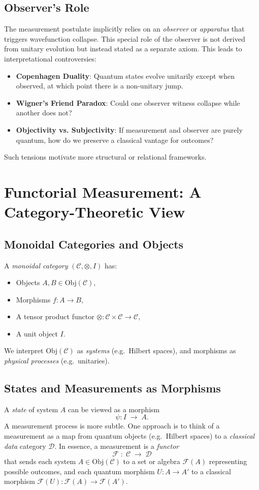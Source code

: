 \documentclass[12pt]{article}
\begin{document}
\subsection{Observer's Role}
The measurement postulate implicitly relies on an \emph{observer} or \emph{apparatus} that triggers 
wavefunction collapse. This special role of the observer is not derived from unitary evolution but instead 
stated as a separate axiom. This leads to interpretational controversies:
\begin{itemize}
    \item \textbf{Copenhagen Duality}: Quantum states evolve unitarily except when observed, at which point 
    there is a non-unitary jump.
    \item \textbf{Wigner's Friend Paradox}: Could one observer witness collapse while another does not?
    \item \textbf{Objectivity vs. Subjectivity}: If measurement and observer are purely quantum, how do we 
    preserve a classical vantage for outcomes?
\end{itemize}
Such tensions motivate more structural or relational frameworks.

\section{Functorial Measurement: A Category-Theoretic View}
\label{sec:functorialMeasurement}

\subsection{Monoidal Categories and Objects}
A \emph{monoidal category} \((\mathcal{C},\otimes, I)\) has:
\begin{itemize}
    \item Objects \(A, B \in \mathrm{Obj}(\mathcal{C})\),
    \item Morphisms \(f : A \to B\),
    \item A tensor product functor \(\otimes : \mathcal{C} \times \mathcal{C} \to \mathcal{C}\),
    \item A unit object \(I\).
\end{itemize}
We interpret \(\mathrm{Obj}(\mathcal{C})\) as \emph{systems} (e.g.\ Hilbert spaces), 
and morphisms as \emph{physical processes} (e.g.\ unitaries).

\subsection{States and Measurements as Morphisms}
A \emph{state} of system \(A\) can be viewed as a morphism 
\[
\psi : I \;\to\; A.
\]
A measurement process is more subtle. One approach is to think of a measurement 
as a map from quantum objects (e.g.\ Hilbert spaces) to a \emph{classical data} category \(\mathcal{D}\). 
In essence, a measurement is a \emph{functor} 
\[
\mathcal{F} \;:\; \mathcal{C} \;\longrightarrow\; \mathcal{D}
\]
that sends each system \(A \in \mathrm{Obj}(\mathcal{C})\) to a set or algebra \(\mathcal{F}(A)\) representing possible outcomes, 
and each quantum morphism \(U : A \to A'\) to a classical morphism \(\mathcal{F}(U) : \mathcal{F}(A) \to \mathcal{F}(A')\).
\end{document}

